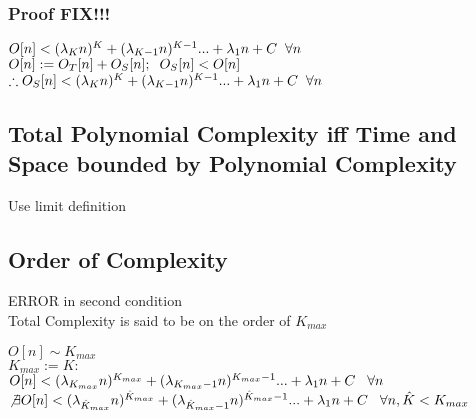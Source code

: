 \documentclass[11pt]{article}
\begin{document}
\subsubsection{Proof FIX!!!}
\begin{center}
$
O[n] < (\lambda_K n)^K + (\lambda_{K-1} n)^{K-1}... + \lambda_1 n + C \hspace{2mm} \forall n
$
\\ \vspace{2mm}
$
O[n] := O_T[n] + O_S[n]; \hspace{2mm} O_S[n] < O[n]
$
\\ \vspace{2mm}
$
\therefore O_S[n] < (\lambda_K n)^K + (\lambda_{K-1} n)^{K-1}... + \lambda_1 n + C \hspace{2mm} \forall n
$
\end{center}










\subsection{Total Polynomial Complexity iff Time and Space bounded by Polynomial Complexity}
Use limit definition













\subsection{Order of Complexity}
ERROR in second condition\\
Total Complexity is said to be on the order of $K_{max}$
\begin{center}
$
O[n] \sim K_{max}
$
\\ \vspace{2mm}
$
K_{max} := K :
$
\\ \vspace{2mm}
$
O[n] < (\lambda_{K_{max}} n)^{K_{max}} + (\lambda_{K_{max}-1} n)^{K_{max}-1}... + \lambda_1 n + C \hspace{3mm} \forall n
$
\\ \vspace{2mm}
$
\not \exists O[n] < (\lambda_{\hat{K}_{max}} n)^{\hat{K}_{max}} + (\lambda_{\hat{K}_{max}-1} n)^{\hat{K}_{max}-1}... + \lambda_1 n + C \hspace{3mm} \forall n,\hat{K} < K_{max}
$
\end{center}
\end{document}
